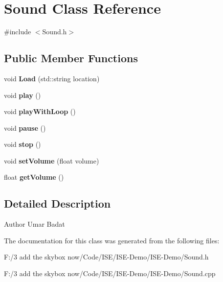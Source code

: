\hypertarget{class_sound}{\section{Sound Class Reference}
\label{class_sound}
}


{\ttfamily \#include $<$Sound.\-h$>$}

\subsection*{Public Member Functions}
\begin{DoxyCompactItemize}
\item 
\hypertarget{class_sound_a310f4de9ec6ebd736c85a70b0c13f9ed}{void {\bfseries Load} (std\-::string location)}\label{class_sound_a310f4de9ec6ebd736c85a70b0c13f9ed}

\item 
\hypertarget{class_sound_aad595b0dc5459e110b53a4e6b2adb0e4}{void {\bfseries play} ()}\label{class_sound_aad595b0dc5459e110b53a4e6b2adb0e4}

\item 
\hypertarget{class_sound_aecf83489f0d26091e713f3832a338d77}{void {\bfseries play\-With\-Loop} ()}\label{class_sound_aecf83489f0d26091e713f3832a338d77}

\item 
\hypertarget{class_sound_a65b0f66e9123caed2809da366ac4d377}{void {\bfseries pause} ()}\label{class_sound_a65b0f66e9123caed2809da366ac4d377}

\item 
\hypertarget{class_sound_a07c551ab56d2f83a861a2f7fd81b480a}{void {\bfseries stop} ()}\label{class_sound_a07c551ab56d2f83a861a2f7fd81b480a}

\item 
\hypertarget{class_sound_aec4c57708809e4422ea01338903a8f9f}{void {\bfseries set\-Volume} (float volume)}\label{class_sound_aec4c57708809e4422ea01338903a8f9f}

\item 
\hypertarget{class_sound_ad7553570dc430c0eac8b53079e7fc842}{float {\bfseries get\-Volume} ()}\label{class_sound_ad7553570dc430c0eac8b53079e7fc842}

\end{DoxyCompactItemize}


\subsection{Detailed Description}
\begin{DoxyAuthor}{Author}
Umar Badat 
\end{DoxyAuthor}


The documentation for this class was generated from the following files\-:\begin{DoxyCompactItemize}
\item 
F\-:/3 add the skybox now/\-Code/\-I\-S\-E/\-I\-S\-E-\/\-Demo/\-I\-S\-E-\/\-Demo/Sound.\-h\item 
F\-:/3 add the skybox now/\-Code/\-I\-S\-E/\-I\-S\-E-\/\-Demo/\-I\-S\-E-\/\-Demo/Sound.\-cpp\end{DoxyCompactItemize}
